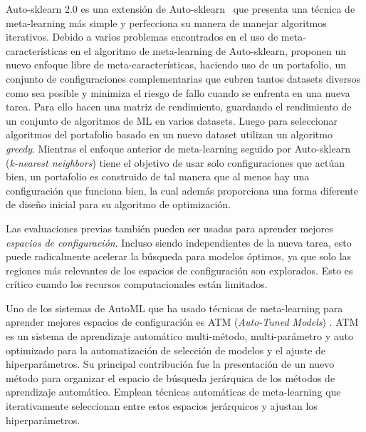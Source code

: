 \documentclass[a4paper,12pt]{article}
\begin{document}
Auto-sklearn 2.0 \cite{Feurer2020AutoSklearn2T} es una extensión de Auto-sklearn~\cite{fuerer2015efficient} que presenta una técnica de meta-learning más simple y perfecciona su manera de manejar algoritmos iterativos. Debido a varios problemas encontrados en el uso de meta-características en el algoritmo de meta-learning de Auto-sklearn, proponen un nuevo enfoque libre de meta-características, haciendo uso de un portafolio, un conjunto de configuraciones complementarias que cubren tantos datasets diversos como sea posible y minimiza el riesgo de fallo cuando se enfrenta en una nueva tarea. Para ello hacen una matriz de rendimiento, guardando el rendimiento de un conjunto de algoritmos de ML en varios datasets. Luego para seleccionar algoritmos del portafolio basado en un nuevo dataset utilizan un algoritmo \textit{greedy}. Mientras el enfoque anterior de meta-learning seguido por Auto-sklearn (\textit{k-nearest neighbors}) tiene el objetivo de usar solo configuraciones que actúan bien, un portafolio es construido de tal manera que al menos hay una configuración que funciona bien, la cual además proporciona una forma diferente de diseño inicial para su algoritmo de optimización.

Las evaluaciones previas también pueden ser usadas para aprender mejores \textit{espacios de configuración}. Incluso siendo independientes de la nueva tarea, esto puede radicalmente acelerar la búsqueda para modelos óptimos, ya que solo las regiones más relevantes de los espacios de configuración son explorados. Esto es crítico cuando los recursos computacionales están limitados. 

Uno de los sistemas de AutoML que ha usado técnicas de meta-learning para aprender mejores espacios de configuración es ATM (\textit{Auto-Tuned Models}) \cite{mendoza2016towards}. ATM es un sistema de aprendizaje automático multi-método, multi-parámetro y auto optimizado para la automatización de selección de modelos y el ajuste de hiperparámetros. Su principal contribución fue la presentación de un nuevo método para organizar el espacio de búsqueda jerárquica de los métodos de aprendizaje automático. 
 Emplean técnicas automáticas de meta-learning que iterativamente seleccionan entre estos espacios jerárquicos y ajustan los hiperparámetros.
\end{document}
